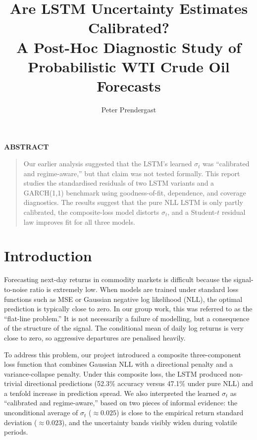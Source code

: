 \documentclass[%
 amsmath,amssymb,
 aps,
 pra,
 floatfix,
 raggedbottom,
 nofootinbib,
12pt,]{revtex4-2}
\providecommand{\texorpdfstring}[2]{#1}
\begin{document}
\title{\texorpdfstring{Are LSTM Uncertainty Estimates Calibrated?\\A Post-Hoc Diagnostic Study of Probabilistic WTI Crude Oil Forecasts}{Are LSTM Uncertainty Estimates Calibrated? A Post-Hoc Diagnostic Study of Probabilistic WTI Crude Oil Forecasts}}
\author{Peter Prendergast}
\noaffiliation
\maketitle
\begin{center}
    \textbf{ABSTRACT}
\end{center}
\begin{quote}
Our earlier analysis suggested that the LSTM's learned $\sigma_t$ was ``calibrated and regime-aware,'' but that claim was not tested formally. This report studies the standardised residuals of two LSTM variants and a GARCH(1,1) benchmark using goodness-of-fit, dependence, and coverage diagnostics. The results suggest that the pure NLL LSTM is only partly calibrated, the composite-loss model distorts $\sigma_t$, and a Student-$t$ residual law improves fit for all three models.
\end{quote}

\thispagestyle{empty}
{\makeatletter
\pagestyle{empty}
\let\l@subsection\@gobbletwo
\let\l@subsubsection\@gobbletwo
\let\l@paragraph\@gobbletwo
\tableofcontents
\makeatother}
\clearpage
\setcounter{page}{0}
\pagestyle{plain}

\section{Introduction}
\label{sec:intro}

Forecasting next-day returns in commodity markets is difficult because the signal-to-noise ratio is extremely low. When models are trained under standard loss functions such as MSE or Gaussian negative log likelihood (NLL), the optimal prediction is typically close to zero. In our group work, this was referred to as the ``flat-line problem.'' It is not necessarily a failure of modelling, but a consequence of the structure of the signal. The conditional mean of daily log returns is very close to zero, so aggressive departures are penalised heavily.

To address this problem, our project introduced a composite three-component loss function that combines Gaussian NLL with a directional penalty and a variance-collapse penalty. Under this composite loss, the LSTM produced non-trivial directional predictions (52.3\% accuracy versus 47.1\% under pure NLL) and a tenfold increase in prediction spread. We also interpreted the learned $\sigma_t$ as ``calibrated and regime-aware,'' based on two pieces of informal evidence: the unconditional average of $\sigma_t$ ($\approx 0.025$) is close to the empirical return standard deviation ($\approx 0.023$), and the uncertainty bands visibly widen during volatile periods.
\end{document}

